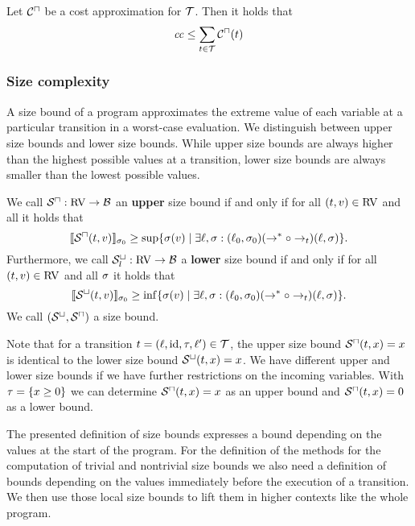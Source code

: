\begin{theorem}
	Let ${\mathcal{C}^\sqcap}$ be a cost approximation for $\mathcal{T}$.
	Then it holds that 
	\[ \mathit{cc} \leq \sum_{t \in \mathcal{T}} {\mathcal{C}^\sqcap}(t) \]
\end{theorem}

\subsubsection{Size complexity}

A size bound of a program approximates the extreme value of each variable at a particular transition in a worst-case evaluation.
We distinguish between upper size bounds and lower size bounds.
While upper size bounds are always higher than the highest possible values at a transition, lower size bounds are always smaller than the lowest possible values.

\begin{definition}
  We call ${\mathcal{S}^\sqcap}: \text{RV} \rightarrow \mathcal{B}$ an \textbf{upper} size bound if and only if for all $(t, v) \in \text{RV}$ and all  it holds that
  \[ \llbracket {\mathcal{S}^\sqcap}(t, v) \rrbracket_{\sigma_0} \geq \sup \lbrace \sigma(v) \mid \exists \ell, \sigma: (\ell_0, \sigma_0) (\rightarrow^* \circ \rightarrow_t) (\ell, \sigma) \rbrace. \]
  Furthermore, we call ${\mathcal{S}^\sqcup_l}: \text{RV} \rightarrow \mathcal{B}$ a \textbf{lower} size bound if and only if for all $(t, v) \in \text{RV}$ and all $\sigma$ it holds that
  \[ \llbracket {\mathcal{S}^\sqcup}(t, v) \rrbracket_{\sigma_0} \geq \inf \lbrace \sigma(v) \mid \exists \ell, \sigma: (\ell_0, \sigma_0) (\rightarrow^* \circ \rightarrow_t) (\ell, \sigma) \rbrace. \]
  We call ${({\mathcal{S}^\sqcup}, {\mathcal{S}^\sqcap})}$ a size bound.
\end{definition}

Note that for a transition $t = (\ell,\text{id},\tau,\ell') \in \mathcal{T}$, the upper size bound ${\mathcal{S}^\sqcap}(t,x) = x$ is identical to the lower size bound ${\mathcal{S}^\sqcup}(t,x) = x$.
We have different upper and lower size bounds if we have further restrictions on the incoming variables.
With $\tau = \lbrace x \geq 0 \rbrace$ we can determine ${\mathcal{S}^\sqcap}(t,x) = x$ as an upper bound and ${\mathcal{S}^\sqcap}(t,x) = 0$ as a lower bound.

The presented definition of size bounds expresses a bound depending on the values at the start of the program.
For the definition of the methods for the computation of trivial and nontrivial size bounds we also need a definition of bounds depending on the values immediately before the execution of a transition.
We then use those local size bounds to lift them in higher contexts like the whole program.

